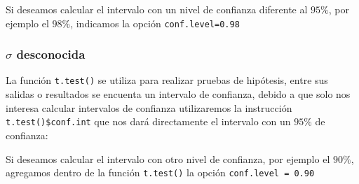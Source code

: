 \documentclass[letterpaper,]{book}
\newenvironment{Shaded}{\begin{snugshade}}{\end{snugshade}}
\newcommand{\CommentTok}[1]{\textcolor[rgb]{0.56,0.35,0.01}{\textit{#1}}}
\newcommand{\DataTypeTok}[1]{\textcolor[rgb]{0.13,0.29,0.53}{#1}}
\newcommand{\FloatTok}[1]{\textcolor[rgb]{0.00,0.00,0.81}{#1}}
\newcommand{\KeywordTok}[1]{\textcolor[rgb]{0.13,0.29,0.53}{\textbf{#1}}}
\newcommand{\NormalTok}[1]{#1}
\newcommand{\OperatorTok}[1]{\textcolor[rgb]{0.81,0.36,0.00}{\textbf{#1}}}
\begin{document}
\begin{Shaded}
\end{Shaded}

Si deseamos calcular el intervalo con un nivel de confianza diferente al \(95\%\), por ejemplo el \(98\%\), indicamos la opción \texttt{conf.level=0.98}

\begin{Shaded}
\end{Shaded}

\hypertarget{musd}{%
\subsubsection{\texorpdfstring{\(\sigma\) desconocida}{\textbackslash{}sigma desconocida}}\label{musd}}

La función \texttt{t.test()} se utiliza para realizar pruebas de hipótesis, entre sus salidas o resultados se encuenta un intervalo de confianza, debido a que solo nos interesa calcular intervalos de confianza utilizaremos la instrucción \texttt{t.test()\$conf.int} que nos dará directamente el intervalo con un \(95\%\) de confianza:

\begin{Shaded}
\end{Shaded}

Si deseamos calcular el intervalo con otro nivel de confianza, por ejemplo el \(90\%\), agregamos dentro de la función \texttt{t.test()} la opción \texttt{conf.level\ =\ 0.90}
\end{document}
